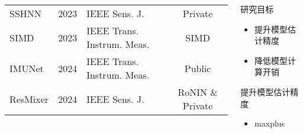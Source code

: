 \begin{frame}
\begin{columns}[t]
\begin{column}{0.5\textwidth}
{\begin{tabular*}{\textwidth}{@{\extracolsep{\fill}}lclc}
				                 SSHNN & 2023 & IEEE Sens. J.                   & Private                \\
				                  SIMD & 2023 & IEEE Trans. Instrum. Meas.      & SIMD                   \\ %
				                IMUNet & 2024 & IEEE Trans. Instrum. Meas.      & Public                 \\
				              ResMixer & 2024 & IEEE Sens. J.                   & RoNIN \& Private       \\
				\bottomrule
			\end{tabular*}     
		}
		\end{column}   
		\begin{column}{0.5\textwidth}
		    \begin{block}{研究目标}
				\begin{itemize}
					\item 提升模型估计精度
					\item 降低模型计算开销
				\end{itemize}
			\end{block}
			\begin{block}{提升模型估计精度}
				\begin{itemize}
					\item maxplus
				\end{itemize}
			\end{block}
		\end{column}
	\end{columns}	
\end{frame}

